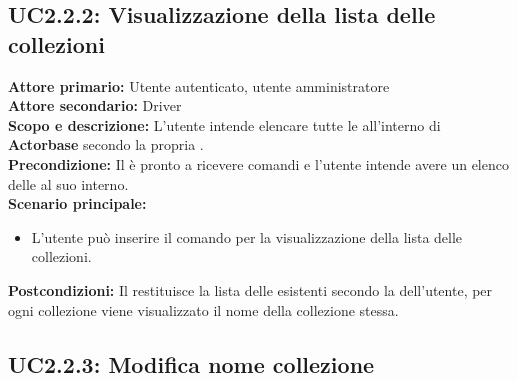 \documentclass{scalatekids-article}
\begin{document}
\subsection{UC2.2.2: Visualizzazione della lista delle collezioni}

\textbf{Attore primario:} Utente autenticato, utente amministratore\\
\textbf{Attore secondario:} Driver\\
\textbf{Scopo e descrizione:} L'utente intende elencare tutte le  all'interno di \textbf{Actorbase} secondo la propria .\\
\textbf{Precondizione:} Il  è pronto a ricevere comandi e l'utente intende avere un elenco delle  al suo interno.\\
\textbf{Scenario principale:}
\begin{itemize}
\item L'utente può inserire il comando per la visualizzazione della lista delle collezioni.
\end{itemize}
\textbf{Postcondizioni:} Il  restituisce la lista delle  esistenti secondo la  dell'utente, per ogni collezione viene visualizzato il nome della collezione stessa.

\subsection{UC2.2.3: Modifica nome collezione}
\end{document}
